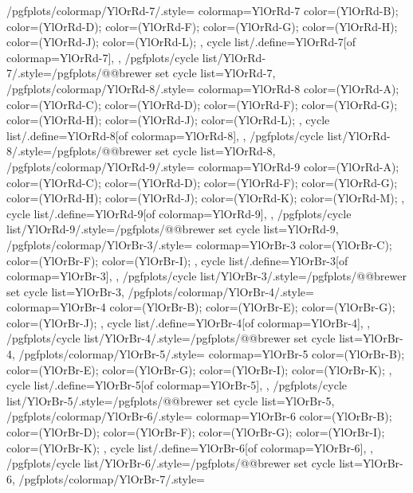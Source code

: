 {  %
  /pgfplots/colormap/YlOrRd-7/.style={
    colormap={YlOrRd-7}{
      color=(YlOrRd-B);
      color=(YlOrRd-D);
      color=(YlOrRd-F);
      color=(YlOrRd-G);
      color=(YlOrRd-H);
      color=(YlOrRd-J);
      color=(YlOrRd-L);
    },
    cycle list/.define={YlOrRd-7}{[of colormap=YlOrRd-7]},
  },
  /pgfplots/cycle list/YlOrRd-7/.style={/pgfplots/@@brewer set cycle list={YlOrRd-7}},
  /pgfplots/colormap/YlOrRd-8/.style={
    colormap={YlOrRd-8}{
      color=(YlOrRd-A);
      color=(YlOrRd-C);
      color=(YlOrRd-D);
      color=(YlOrRd-F);
      color=(YlOrRd-G);
      color=(YlOrRd-H);
      color=(YlOrRd-J);
      color=(YlOrRd-L);
    },
    cycle list/.define={YlOrRd-8}{[of colormap=YlOrRd-8]},
  },
  /pgfplots/cycle list/YlOrRd-8/.style={/pgfplots/@@brewer set cycle list={YlOrRd-8}},
  /pgfplots/colormap/YlOrRd-9/.style={
    colormap={YlOrRd-9}{
      color=(YlOrRd-A);
      color=(YlOrRd-C);
      color=(YlOrRd-D);
      color=(YlOrRd-F);
      color=(YlOrRd-G);
      color=(YlOrRd-H);
      color=(YlOrRd-J);
      color=(YlOrRd-K);
      color=(YlOrRd-M);
    },
    cycle list/.define={YlOrRd-9}{[of colormap=YlOrRd-9]},
  },
  /pgfplots/cycle list/YlOrRd-9/.style={/pgfplots/@@brewer set cycle list={YlOrRd-9}},
  /pgfplots/colormap/YlOrBr-3/.style={
    colormap={YlOrBr-3}{
      color=(YlOrBr-C);
      color=(YlOrBr-F);
      color=(YlOrBr-I);
    },
    cycle list/.define={YlOrBr-3}{[of colormap=YlOrBr-3]},
  },
  /pgfplots/cycle list/YlOrBr-3/.style={/pgfplots/@@brewer set cycle list={YlOrBr-3}},
  /pgfplots/colormap/YlOrBr-4/.style={
    colormap={YlOrBr-4}{
      color=(YlOrBr-B);
      color=(YlOrBr-E);
      color=(YlOrBr-G);
      color=(YlOrBr-J);
    },
    cycle list/.define={YlOrBr-4}{[of colormap=YlOrBr-4]},
  },
  /pgfplots/cycle list/YlOrBr-4/.style={/pgfplots/@@brewer set cycle list={YlOrBr-4}},
  /pgfplots/colormap/YlOrBr-5/.style={
    colormap={YlOrBr-5}{
      color=(YlOrBr-B);
      color=(YlOrBr-E);
      color=(YlOrBr-G);
      color=(YlOrBr-I);
      color=(YlOrBr-K);
    },
    cycle list/.define={YlOrBr-5}{[of colormap=YlOrBr-5]},
  },
  /pgfplots/cycle list/YlOrBr-5/.style={/pgfplots/@@brewer set cycle list={YlOrBr-5}},
  /pgfplots/colormap/YlOrBr-6/.style={
    colormap={YlOrBr-6}{
      color=(YlOrBr-B);
      color=(YlOrBr-D);
      color=(YlOrBr-F);
      color=(YlOrBr-G);
      color=(YlOrBr-I);
      color=(YlOrBr-K);
    },
    cycle list/.define={YlOrBr-6}{[of colormap=YlOrBr-6]},
  },
  /pgfplots/cycle list/YlOrBr-6/.style={/pgfplots/@@brewer set cycle list={YlOrBr-6}},
  /pgfplots/colormap/YlOrBr-7/.style={
}}
